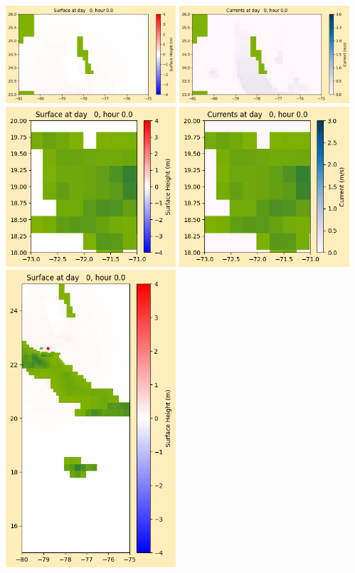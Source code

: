 \documentclass[11pt]{article}
\begin{document}
\vskip 10pt 
\includegraphics[width=0.475\textwidth]{frame0012fig1003.png}
\includegraphics[width=0.475\textwidth]{frame0012fig1004.png}
\vskip 10pt 
\includegraphics[width=0.475\textwidth]{frame0012fig1005.png}
\includegraphics[width=0.475\textwidth]{frame0012fig1006.png}
\vskip 10pt 
\includegraphics[width=0.475\textwidth]{frame0012fig1007.png}
\end{document}
